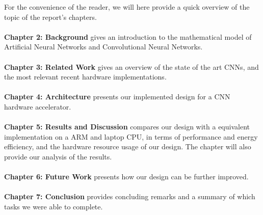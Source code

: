 For the convenience of the reader, we will here provide a quick overview of the topic of the report's chapters. \\ \hfil \\ \hfil
\textbf{Chapter 2: Background} gives an introduction to the mathematical model of Artificial Neural Networks and Convolutional Neural Networks. \\ \hfil \\ \hfil
\textbf{Chapter 3: Related Work} gives an overview of the state of the art CNNs, and the most relevant recent hardware implementations. \\ \hfil \\ \hfil
\textbf{Chapter 4: Architecture} presents our implemented design for a CNN hardware accelerator.  \\ \hfil \\ \hfil
\textbf{Chapter 5: Results and Discussion} compares our design with a equivalent implementation on a ARM and laptop CPU, in terms of performance and energy efficiency, and the hardware resource usage of our design. The chapter will also provide our analysis of the results.  \\ \hfil \\ \hfil
\textbf{Chapter 6: Future Work} presents how our design can be further improved. \\ \hfil \\ \hfil
\textbf{Chapter 7: Conclusion} provides concluding remarks and a summary of which tasks we were able to complete.\\ \hfil \\ \hfil



